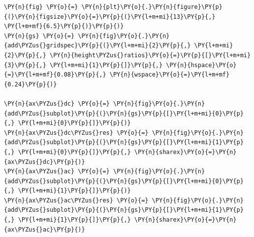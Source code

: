     \begin{tcolorbox}[breakable, size=fbox, boxrule=1pt, pad at break*=1mm,colback=cellbackground, colframe=cellborder]
\begin{Verbatim}[commandchars=\\\{\}]
\PY{n}{fig} \PY{o}{=} \PY{n}{plt}\PY{o}{.}\PY{n}{figure}\PY{p}{(}\PY{n}{figsize}\PY{o}{=}\PY{p}{(}\PY{l+m+mi}{13}\PY{p}{,} \PY{l+m+mf}{6.5}\PY{p}{)}\PY{p}{)}
\PY{n}{gs} \PY{o}{=} \PY{n}{fig}\PY{o}{.}\PY{n}{add\PYZus{}gridspec}\PY{p}{(}\PY{l+m+mi}{2}\PY{p}{,} \PY{l+m+mi}{2}\PY{p}{,} \PY{n}{height\PYZus{}ratios}\PY{o}{=}\PY{p}{[}\PY{l+m+mi}{3}\PY{p}{,} \PY{l+m+mi}{1}\PY{p}{]}\PY{p}{,} \PY{n}{hspace}\PY{o}{=}\PY{l+m+mf}{0.08}\PY{p}{,} \PY{n}{wspace}\PY{o}{=}\PY{l+m+mf}{0.24}\PY{p}{)}

\PY{n}{ax\PYZus{}dc} \PY{o}{=} \PY{n}{fig}\PY{o}{.}\PY{n}{add\PYZus{}subplot}\PY{p}{(}\PY{n}{gs}\PY{p}{[}\PY{l+m+mi}{0}\PY{p}{,} \PY{l+m+mi}{0}\PY{p}{]}\PY{p}{)}
\PY{n}{ax\PYZus{}dc\PYZus{}res} \PY{o}{=} \PY{n}{fig}\PY{o}{.}\PY{n}{add\PYZus{}subplot}\PY{p}{(}\PY{n}{gs}\PY{p}{[}\PY{l+m+mi}{1}\PY{p}{,} \PY{l+m+mi}{0}\PY{p}{]}\PY{p}{,} \PY{n}{sharex}\PY{o}{=}\PY{n}{ax\PYZus{}dc}\PY{p}{)}
\PY{n}{ax\PYZus{}ac} \PY{o}{=} \PY{n}{fig}\PY{o}{.}\PY{n}{add\PYZus{}subplot}\PY{p}{(}\PY{n}{gs}\PY{p}{[}\PY{l+m+mi}{0}\PY{p}{,} \PY{l+m+mi}{1}\PY{p}{]}\PY{p}{)}
\PY{n}{ax\PYZus{}ac\PYZus{}res} \PY{o}{=} \PY{n}{fig}\PY{o}{.}\PY{n}{add\PYZus{}subplot}\PY{p}{(}\PY{n}{gs}\PY{p}{[}\PY{l+m+mi}{1}\PY{p}{,} \PY{l+m+mi}{1}\PY{p}{]}\PY{p}{,} \PY{n}{sharex}\PY{o}{=}\PY{n}{ax\PYZus{}ac}\PY{p}{)}


\end{Verbatim}
\end{tcolorbox}

